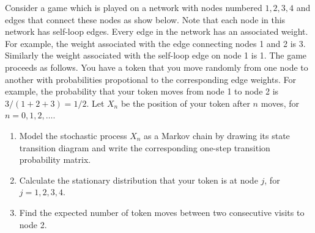 \begin{problem}
Consider a game which is played on a network with nodes numbered \( 1, 2, 3, 4 \) and edges that connect these nodes as show below. Note that each node in this network has self-loop edges. Every edge in the network has an associated weight. For example, the weight associated with the edge connecting nodes 1 and 2 is 3. Similarly the weight associated with the self-loop edge on node 1 is 1. The game proceeds as follows. You have a token that you move randomly from one node to another with probabilities propotional to the corresponding edge weights. For example, the probability that your token moves from node 1 to node 2 is \( 3/(1 + 2 + 3) = 1/2 \). Let \( X_n \) be the position of your token after \( n \) moves, for \( n = 0, 1, 2, \ldots \).
\begin{center}
\end{center}
\begin{enumerate}[nolistsep,label=(\alph*)]
    \item Model the stochastic process \( X_n \) as a Markov chain by drawing its state transition diagram and write the corresponding one-step transition probability matrix.
    \item Calculate the stationary distribution that your token is at node \( j \), for \( j = 1, 2, 3, 4 \).
    \item Find the expected number of token moves between two consecutive visits to node 2.
\end{enumerate}
\end{problem}

